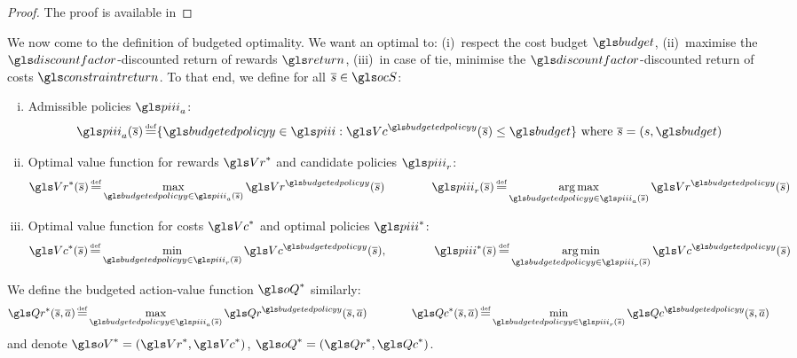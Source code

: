 \begin{proof}
    The proof is available in 
\end{proof}

\begin{definition}
    We now come to the definition of budgeted optimality. We want an optimal  to: (i)~respect the cost budget $\budget$, (ii)~maximise the $\discountfactor$-discounted return of rewards $\return$, (iii)~in case of tie, minimise the $\discountfactor$-discounted return of costs $\constraintreturn$. To that end, we define for all $\os\in\ocS$:
    \begin{enumerate}[(i)]
        \item Admissible policies $\policies_a$:
        \begin{equation}
            \policies_a(\os) \eqdef \{\budgetedpolicy\in\policies: \Vc^{\budgetedpolicy}(\os) \leq \budget\}\text{ where }\os = (s, \budget)
        \end{equation}
        \item Optimal value function for rewards $\Vr^*$ and candidate policies $\policies_r$:
        \begin{equation}
            \Vr^*(\os) \eqdef \max_{\budgetedpolicy\in\policies_a(\os)}  \Vr^{\budgetedpolicy}(\os) \qquad\qquad \policies_r(\os) \eqdef \argmax_{\budgetedpolicy\in\policies_a(\os)}  \Vr^{\budgetedpolicy}(\os)
        \end{equation}
        \item Optimal value function for costs $\Vc^*$ and optimal policies $\policies^*$:
        \begin{equation}
            \Vc^*(\os) \eqdef \min_{\budgetedpolicy\in\policies_r(\os)}  \Vc^{\budgetedpolicy}(\os), \qquad\qquad \policies^*(\os) \eqdef \argmin_{\budgetedpolicy\in\policies_r(\os)}  \Vc^{\budgetedpolicy}(\os)
        \end{equation}
    \end{enumerate}
    We define the budgeted action-value function $\oQ^*$ similarly:
    \begin{equation}
        \Qr^*(\os, \oa) \eqdef \max_{\budgetedpolicy\in\policies_a(\os)}  \Qr^{\budgetedpolicy}(\os, \oa) \qquad\qquad \Qc^*(\os, \oa) \eqdef \min_{\budgetedpolicy\in\policies_r(\os)}  \Qc^{\budgetedpolicy}(\os, \oa)
    \end{equation}
    and denote $\oV^* = (\Vr^*, \Vc^*)$, $\oQ^* = (\Qr^*, \Qc^*)$.
\end{definition}

